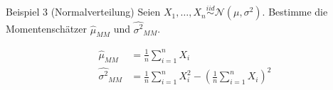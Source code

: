 \documentclass[t,11pt,aspectratio=169]{beamer}
\begin{document}
\begin{frame}
\begin{block}{Beispiel 3 (Normalverteilung)}
	Seien $X_1,\dots,X_n\overset{iid}{\sim}\mathcal{N}(\mu,\sigma^2)$. Bestimme die Momentenschätzer $\hat{\mu}_{MM}$ und $\hat{\sigma^2}_{MM}$.
\end{block}
\begin{align*}
\hat{\mu}_{MM} &= \frac{1}{n}\sum_{i=1}^{n}X_i\\
\hat{\sigma^2}_{MM} &= \frac{1}{n}\sum_{i=1}^{n}X_i^2 - \left(\frac{1}{n}\sum_{i=1}^{n}X_i\right)^2
\end{align*}
\end{frame}
\end{document}
